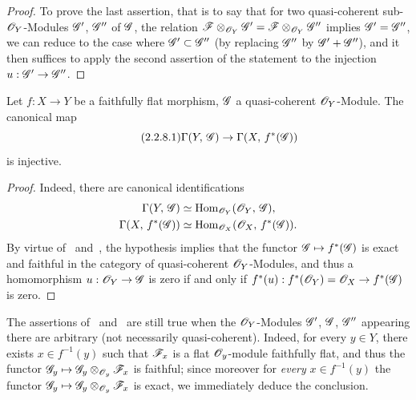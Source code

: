\begin{proof}
To prove the last assertion, that is to say that for two quasi-coherent sub-$\mathscr{O}_Y$-Modules $\mathscr{G}'$, $\mathscr{G}''$ of $\mathscr{G}$, the relation $\mathscr{F}\otimes_{\mathscr{O}_Y}\mathscr{G}'=\mathscr{F}\otimes_{\mathscr{O}_Y}\mathscr{G}''$ implies $\mathscr{G}'=\mathscr{G}''$, we can reduce to the case where $\mathscr{G}'\subset\mathscr{G}''$ (by replacing $\mathscr{G}''$ by $\mathscr{G}'+\mathscr{G}''$), and it then suffices to apply the second assertion of the statement to the injection $u:\mathscr{G}'\to\mathscr{G}''$.
\end{proof}

\begin{corollary}[2.2.8]
\label{IV.2.2.8}
Let $f:X\to Y$ be a faithfully flat morphism, $\mathscr{G}$ a quasi-coherent $\mathscr{O}_Y$-Module.
The canonical map
\begin{equation}
\tag{2.2.8.1}
\label{IV.2.2.8.1}
  \Gamma(Y,\,\mathscr{G}) \to \Gamma(X,\,f^*(\mathscr{G}))
\end{equation}
is injective.
\end{corollary}

\begin{proof}
Indeed, there are canonical identifications~
\begin{align*}
  \Gamma(Y,\,\mathscr{G})
    &\simeq \operatorname{Hom}_{\mathscr{O}_Y}(\mathscr{O}_Y,\,\mathscr{G}),\\
  \Gamma(X,\,f^*(\mathscr{G}))
    &\simeq \operatorname{Hom}_{\mathscr{O}_X}(\mathscr{O}_X,\,f^*(\mathscr{G})).
\end{align*}
By virtue of~ and~, the hypothesis implies that the functor $\mathscr{G}\mapsto f^*(\mathscr{G})$ is exact and faithful in the category of quasi-coherent $\mathscr{O}_Y$-Modules, and thus a homomorphism $u:\mathscr{O}_Y\to\mathscr{G}$ is zero if and only if $f^*(u):f^*(\mathscr{O}_Y)=\mathscr{O}_X\to f^*(\mathscr{G})$ is zero.
\end{proof}

\begin{remark}[2.2.9]
\label{IV.2.2.9}
The assertions of~ and~ are still true when the $\mathscr{O}_Y$-Modules $\mathscr{G}'$, $\mathscr{G}$, $\mathscr{G}''$ appearing there are arbitrary (not necessarily quasi-coherent).
Indeed, for every $y\in Y$, there exists $x\in f^{-1}(y)$ such that $\mathscr{F}_x$ is a flat $\mathscr{O}_y$-module
faithfully flat, and thus the functor $\mathscr{G}_y\mapsto\mathscr{G}_y\otimes_{\mathscr{O}_y}\mathscr{F}_x$ is faithful; since moreover for \emph{every} $x\in f^{-1}(y)$ the functor $\mathscr{G}_y\mapsto\mathscr{G}_y\otimes_{\mathscr{O}_y}\mathscr{F}_x$ is exact, we immediately deduce the conclusion.
\end{remark}

